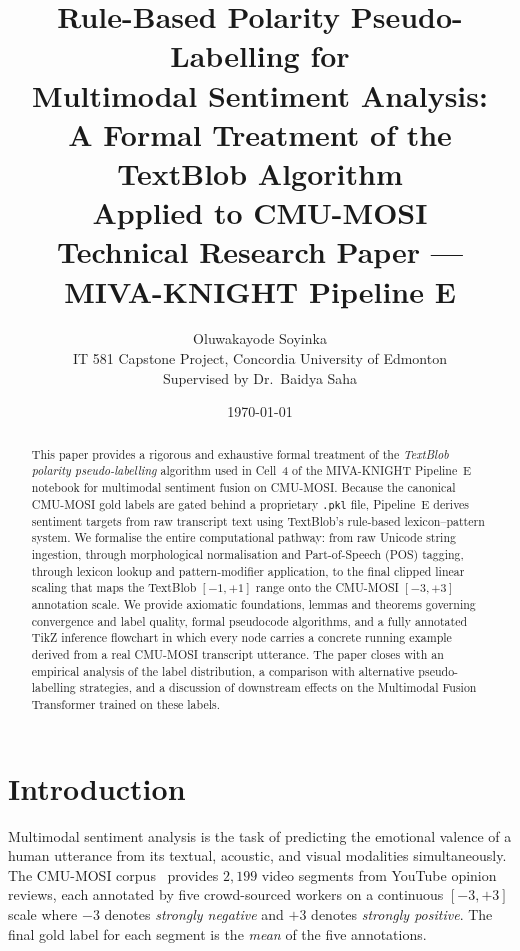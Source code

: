 \documentclass[12pt,a4paper]{article}
\title{%
  \textbf{Rule-Based Polarity Pseudo-Labelling for\\
  Multimodal Sentiment Analysis:\\[4pt]
  A Formal Treatment of the TextBlob Algorithm\\
  Applied to CMU-MOSI}\\[8pt]
  {\large Technical Research Paper — MIVA-KNIGHT Pipeline E}
}
\author{%
  Oluwakayode Soyinka\\
  \small IT 581 Capstone Project, Concordia University of Edmonton\\
  \small Supervised by Dr.\ Baidya Saha
}
\date{\today}
\theoremstyle{plain}
\theoremstyle{definition}
\begin{document}

\maketitle
\thispagestyle{empty}

\begin{abstract}
  This paper provides a rigorous and exhaustive formal treatment of the
  \emph{TextBlob polarity pseudo-labelling} algorithm used in Cell~4 of
  the MIVA-KNIGHT Pipeline~E notebook for multimodal sentiment fusion on
  CMU-MOSI.  Because the canonical CMU-MOSI gold labels are gated behind
  a proprietary \texttt{.pkl} file, Pipeline~E derives sentiment targets
  from raw transcript text using TextBlob's rule-based lexicon–pattern
  system.  We formalise the entire computational pathway: from raw Unicode
  string ingestion, through morphological normalisation and Part-of-Speech
  (POS) tagging, through lexicon lookup and pattern-modifier application,
  to the final clipped linear scaling that maps the TextBlob
  $[-1,+1]$ range onto the CMU-MOSI $[-3,+3]$ annotation scale.  We
  provide axiomatic foundations, lemmas and theorems governing convergence
  and label quality, formal pseudocode algorithms, and a fully annotated
  TikZ inference flowchart in which every node carries a concrete
  running example derived from a real CMU-MOSI transcript utterance.
  The paper closes with an empirical analysis of the label distribution,
  a comparison with alternative pseudo-labelling strategies, and a
  discussion of downstream effects on the Multimodal Fusion Transformer
  trained on these labels.
\end{abstract}

\tableofcontents
\newpage

\section{Introduction}
\label{sec:intro}

Multimodal sentiment analysis is the task of predicting the emotional
valence of a human utterance from its textual, acoustic, and visual
modalities simultaneously.  The CMU-MOSI corpus~\citep{zadeh2016mosi}
provides $2{,}199$ video segments from YouTube opinion reviews, each
annotated by five crowd-sourced workers on a continuous $[-3,+3]$ scale
where $-3$ denotes \emph{strongly negative} and $+3$ denotes
\emph{strongly positive}.  The final gold label for each segment is the
\emph{mean} of the five annotations.
\end{document}
